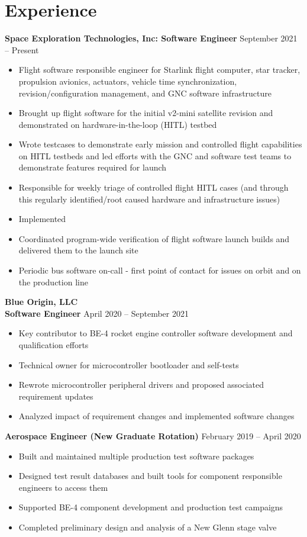 \documentclass{article}
\begin{document}
\section{Experience}

\textbf{Space Exploration Technologies, Inc: Software Engineer} \hfill September 2021 -- Present
\begin{itemize}
    \item Flight software responsible engineer for Starlink flight computer, star tracker, propulsion avionics, actuators, vehicle time synchronization, revision/configuration management, and GNC software infrastructure
    \item Brought up flight software for the initial v2-mini satellite revision and demonstrated on hardware-in-the-loop (HITL) testbed
    \item Wrote testcases to demonstrate early mission and controlled flight capabilities on HITL testbeds and led efforts with the GNC and software test teams to demonstrate features required for launch
    \item Responsible for weekly triage of controlled flight HITL cases (and through this regularly identified/root caused hardware and infrastructure issues)
    \item Implemented 
    \item Coordinated program-wide verification of flight software launch builds and delivered them to the launch site
    \item Periodic bus software on-call - first point of contact for issues on orbit and on the production line
\end{itemize}

\textbf{Blue Origin, LLC}\\
\textbf{Software Engineer} \hfill April 2020 -- September 2021
\begin{itemize}
    \item Key contributor to BE-4 rocket engine controller software development and qualification efforts
    \item Technical owner for microcontroller bootloader and self-tests
    \item Rewrote microcontroller peripheral drivers and proposed associated requirement updates
    \item Analyzed impact of requirement changes and implemented software changes
\end{itemize}

\textbf{Aerospace Engineer (New Graduate Rotation)} \hfill February 2019 -- April 2020
\begin{itemize}
    \item Built and maintained multiple production test software packages
    \item Designed test result databases and built tools for component responsible engineers to access them
    \item Supported BE-4 component development and production test campaigns
    \item Completed preliminary design and analysis of a New Glenn stage valve
\end{itemize}
\end{document}
